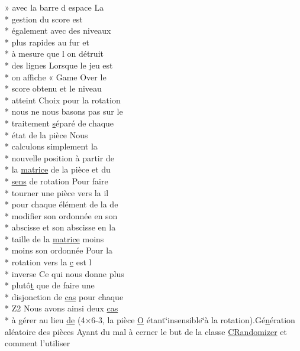 \begin{DoxyCompactItemize}
» avec la barre d espace La \\*
gestion du score est \\*
également avec des niveaux \\*
plus rapides au fur et \\*
à mesure que l on détruit \\*
des lignes Lorsque le jeu est \\*
on affiche « Game Over le \\*
score obtenu et le niveau \\*
atteint Choix pour la rotation \\*
nous ne nous basons pas sur le \\*
traitement \hyperlink{gl_8h_ad585a1393cfa368fa9dc3d8ebff640d5}{s}éparé de chaque \\*
état de la pièce Nous \\*
calculons simplement la \\*
nouvelle position à partir de \\*
la \hyperlink{mainpage_8dox_af2e36bcdda8980a3e5c1f4013331ee45}{matrice} de la pièce et du \\*
\hyperlink{mainpage_8dox_aa08a2c237abaf70493855740d9c5d0c8}{sens} de rotation Pour faire \\*
tourner une pièce vers la il \\*
pour chaque élément de la de \\*
modifier son ordonnée en son \\*
abscisse et son abscisse en la \\*
taille de la \hyperlink{mainpage_8dox_af2e36bcdda8980a3e5c1f4013331ee45}{matrice} moins \\*
moins son ordonnée Pour la \\*
rotation vers la \hyperlink{glext_8h_a1f2d7f8147412c43ba2303a56f97ee73}{c} est l \\*
inverse Ce qui nous donne plus \\*
plutô\hyperlink{gl_8h_a00140d6f5c548b26daf170bf16e86a6d}{t} que de faire une \\*
disjonction de \hyperlink{mainpage_8dox_a28d908e91a20ecb016d27b941f85907c}{cas} pour chaque \\*
Z2 Nous avons ainsi deux \hyperlink{mainpage_8dox_a28d908e91a20ecb016d27b941f85907c}{cas} \\*
à \hyperlink{glext_8h_a9cd653b1648845554169fbc3a3f6d37a}{g}érer au lieu \hyperlink{mainpage_8dox_ab37fa35e77d95c6d0d0ab620c97c3db8}{de} (4×6-\/3, la pièce \hyperlink{mainpage_8dox_abdf7c4e28de4c462789e8ddbcdd8d9a9}{O} étant\char`\"{}insensible\char`\"{}à la rotation).Gé\hyperlink{glext_8h_a0788d3762d0c3c76e4c094d8078b4c27}{n}ération aléatoire des pièces Ayant du mal à cerner le but de la classe \hyperlink{class_c_randomizer}{C\-Randomizer} et comment l'utiliser

\end{DoxyCompactItemize}
